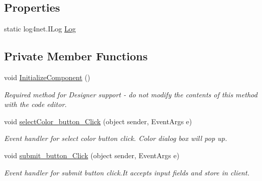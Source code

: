 \subsection*{Properties}
\begin{DoxyCompactItemize}
\item 
static log4net.\+I\+Log \hyperlink{classWildlifeTrackingApp_1_1AddCategory_a5fc9abb86e6110ecd61d0a1a7d740a8a}{Log}
\end{DoxyCompactItemize}
\subsection*{Private Member Functions}
\begin{DoxyCompactItemize}
\item 
void \hyperlink{classWildlifeTrackingApp_1_1AddCategory_a6405d5db675d5338663195a4d12b4c9f}{Initialize\+Component} ()
\begin{DoxyCompactList}\small\item\em Required method for Designer support -\/ do not modify the contents of this method with the code editor. \end{DoxyCompactList}\item 
void \hyperlink{classWildlifeTrackingApp_1_1AddCategory_a98c6d7308f3d8ce093b205cec7b9422a}{select\+Color\+\_\+button\+\_\+\+Click} (object sender, Event\+Args e)
\begin{DoxyCompactList}\small\item\em Event handler for select color button click. Color dialog box will pop up. \end{DoxyCompactList}\item 
void \hyperlink{classWildlifeTrackingApp_1_1AddCategory_a4a8fd9eeb145ce142cc04944541ff56a}{submit\+\_\+button\+\_\+\+Click} (object sender, Event\+Args e)
\begin{DoxyCompactList}\small\item\em Event handler for submit button click.\+It accepts input fields and store in client. \end{DoxyCompactList}\end{DoxyCompactItemize}
